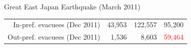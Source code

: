 \documentclass[serif, aspectratio=169]{beamer}
\begin{document}
\begin{frame}{Great East Japan Earthquake (March 2011)}
\begin{minipage}{1.00\textwidth}
\begin{flushleft}
\begin{table}[h!]
\begin{minipage}[c]{0.51\textwidth}
{\begin{tabular}{|r|c|c|c|}
    In-pref. evacuees (Dec 2011) & \multicolumn{1}{r|}{43,953} & \multicolumn{1}{r|}{122,557} & \multicolumn{1}{r|}{95,200} \\
    Out-pref. evacuees (Dec 2011) & \multicolumn{1}{r|}{1,536} & \multicolumn{1}{r|}{8,603} & \multicolumn{1}{r|}{\textcolor{red}{59,464}} \\
    \hline
    \end{tabular}
    }
\end{minipage}

  \vspace{-1.6cm}
\end{table}
\end{flushleft}
    \end{minipage}
    
\end{frame}
\end{document}
